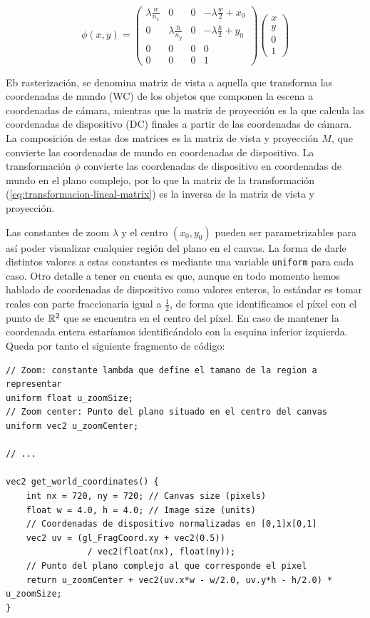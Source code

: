 \begin{equation}
    \label{eq:transformacion-lineal-matrix}
    \phi(x,y)=\left(\begin{array}{ccc|c}
        \lambda\frac{w}{n_x} & 0 & 0 & -\lambda\frac{w}{2}+x_0 \\

        0 & \lambda\frac{h}{n_y} & 0 & -\lambda\frac{h}{2}+y_0 \\
        0 & 0 & 0 & 0 \\ \hline
        0 & 0 & 0 & 1
    \end{array}\right)\left(
    \begin{array}{c}
        x \\ y \\ 0 \\ \hline 1
    \end{array}\right)
\end{equation}

Eb rasterización, se denomina matriz de vista a aquella que transforma las coordenadas de mundo (WC) de los objetos que componen la escena a coordenadas de cámara, mientras que la matriz de proyección es la que calcula las coordenadas de dispositivo (DC) finales a partir de las coordenadas de cámara. La composición de estas dos matrices es la matriz de vista y proyección $M$, que convierte las coordenadas de mundo en coordenadas de dispositivo. La transformación $\phi$ convierte las coordenadas de dispositivo en coordenadas de mundo en el plano complejo, por lo que la matriz de la transformación (\ref{eq:transformacion-lineal-matrix}) es la inversa de la matriz de vista y proyección.


Las constantes de zoom $\lambda$ y el centro $(x_0,y_0)$ pueden ser parametrizables para así poder visualizar cualquier región del plano en el canvas. La forma de darle distintos valores a estas constantes es mediante una variable \verb|uniform| para cada caso. Otro detalle a tener en cuenta es que, aunque en todo momento hemos hablado de coordenadas de dispositivo como valores enteros, lo estándar es tomar reales con parte fraccionaria igual a $\frac{1}{2}$, de forma que identificamos el píxel con el punto de $\mathbb{R}^2$ que se encuentra en el centro del píxel. En caso de mantener la coordenada entera estaríamos identificándolo con la esquina inferior izquierda. Queda por tanto el siguiente fragmento de código:

\begin{lstlisting}
// Zoom: constante lambda que define el tamano de la region a representar
uniform float u_zoomSize;
// Zoom center: Punto del plano situado en el centro del canvas
uniform vec2 u_zoomCenter;

// ... 

vec2 get_world_coordinates() {
    int nx = 720, ny = 720; // Canvas size (pixels)
    float w = 4.0, h = 4.0; // Image size (units) 
    // Coordenadas de dispositivo normalizadas en [0,1]x[0,1]
    vec2 uv = (gl_FragCoord.xy + vec2(0.5)) 
                / vec2(float(nx), float(ny));
    // Punto del plano complejo al que corresponde el pixel
    return u_zoomCenter + vec2(uv.x*w - w/2.0, uv.y*h - h/2.0) * u_zoomSize;
}
\end{lstlisting}


